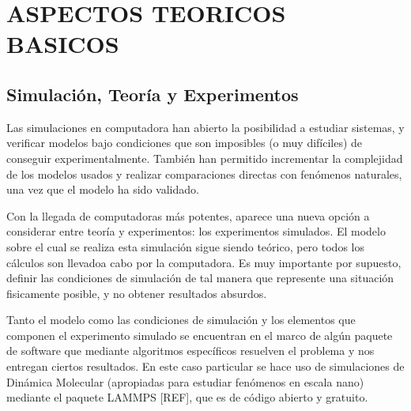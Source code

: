 
\chapter{ASPECTOS TEORICOS BASICOS} %

\label{C2} %



\section{Simulación, Teoría y Experimentos}
\label{S2_1}

Las simulaciones en computadora han abierto la posibilidad a estudiar sistemas, y verificar modelos bajo condiciones que son imposibles (o muy difíciles) de conseguir experimentalmente. También han permitido incrementar la complejidad de los modelos usados y realizar comparaciones directas con fenómenos naturales, una vez que el modelo ha sido validado.

Con la llegada de computadoras más potentes, aparece una nueva opción a considerar entre teoría y experimentos: los experimentos simulados. El modelo sobre el cual se realiza esta simulación sigue siendo teórico, pero todos los cálculos son llevadoa cabo por la computadora. Es muy importante por supuesto, definir las condiciones de simulación de tal manera que represente una situación fisicamente posible, y no obtener resultados absurdos.

Tanto el modelo como las condiciones de simulación y los elementos que componen el experimento simulado se encuentran en el marco de algún paquete de software que mediante algoritmos específicos resuelven el problema y nos entregan ciertos resultados. En este caso particular se hace uso de simulaciones de Dinámica Molecular (apropiadas para estudiar fenómenos en escala nano) mediante el paquete LAMMPS [REF], que es de código abierto y gratuito.


